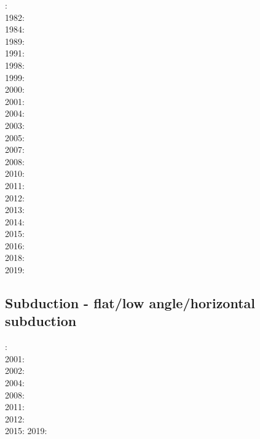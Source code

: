 {\scriptsize
{}: \cite{bird78}\\
1982: \cite{clwv82}\\
1984: \cite{cade84}\\
1989: \cite{clwv89}\\
1991: \cite{muph91}\\
1998: \cite{togu98}\\
1999: \cite{fagd99}\\
2000: \cite{pybf00}\\
2001: \cite{dohe01}\cite{reyb01}\cite{brry01}\\
2004: \cite{ster04}\cite{guhl04}\cite{solo04}\\
2003: \cite{hags03}\\
2005: \cite{bihi05}\\
2007: \cite{kore07}\\
2008: \cite{uegs08}\\
2010: \cite{nigm10}\cite{bucl10}\\
2011: \cite{bagw11}\cite{nigm11}\\
2012: \cite{stri12}\\
2013: \cite{dyge13}\cite{mana13}\cite{kore13}\\
2014: \cite{recf14}\cite{macg14}\\
2015: \cite{matv15}\cite{pebu15}\cite{vapm15}\\
2016: \cite{crta16}\\
2018: \cite{zhlg18}\cite{basq18}\\
2019: \cite{begb19}\cite{gubg19}\cite{ulcw19}
}

\subsection{Subduction - flat/low angle/horizontal subduction}

{\scriptsize
{}: \cite{vavv00}\\
2001: \cite{vavv01}\\
2002: \cite{vavv02}\cite{vavv02b}\\
2004: \cite{vavv04d}\\
2008: \cite{pekh08}\\
2011: \cite{cube11}\\
2012: \cite{mapm12}\\
2015: \cite{gehm15}\cite{tarn15}
2019: \cite{sifg19}\cite{sams19b}
}
